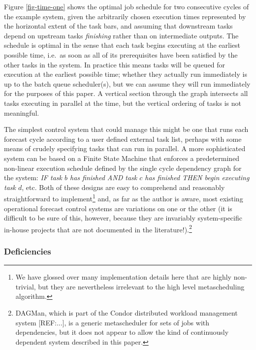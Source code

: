 \documentclass[11pt,a4paper]{article}
\begin{document}
Figure \ref{fig-time-one} shows the optimal job schedule for two
consecutive cycles of the example system, given the arbitrarily chosen
execution times represented by the horizontal extent of the task bars,
and assuming that downstream tasks depend on upstream tasks {\em
finishing} rather than on intermediate outputs.  The schedule is optimal in
the sense that each task begins executing at the earliest possible time,
i.e.\ as soon as all of its prerequisites have been satisfied by the
other tasks in the system. In practice this means tasks will be queued
for execution at the earliest possible time; whether they actually run
immediately is up to the batch queue scheduler(s), but we can assume
they will run immediately for the purposes of this paper. A vertical
section through the graph intersects all tasks executing in parallel
at the time, but the vertical ordering of tasks is not meaningful.

The simplest control system that could manage this might be one that
runs each forecast cycle according to a user defined external task list,
perhaps with some means of crudely specifying tasks that can run in
parallel.  A more sophisticated system can be based on a Finite State
Machine that enforces a predetermined non-linear execution schedule
defined by the single cycle dependency graph for the system: {\em IF
task $b$ has finished AND task $c$ has finished THEN begin executing
task $d$}, etc.  Both of these designs are easy to comprehend and
reasonably straightforward to implement\footnote{We have glossed over
many implementation details here that are highly non-trivial, but they
are nevertheless irrelevant to the high level metascheduling algorithm.}
and, as far as the author is aware, most existing operational forecast
control systems are variations on one or the other (it is difficult to
be sure of this, however, because they are invariably system-specific
in-house projects that are not documented in the
literature!).\footnote{DAGMan, which is part of the Condor distributed
workload management system [REF:...], is a generic metascheduler for
sets of jobs with dependencies, but it does not appear to allow the kind
of continuously dependent system described in this paper.}

\subsubsection{Deficiencies}
\end{document}
